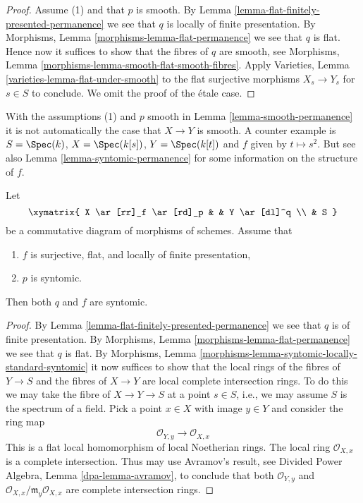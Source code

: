 \begin{proof}
Assume (1) and that $p$ is smooth. By
Lemma \ref{lemma-flat-finitely-presented-permanence}
we see that $q$ is locally of finite presentation.
By
Morphisms, Lemma \ref{morphisms-lemma-flat-permanence}
we see that $q$ is flat.
Hence now it suffices to show that the fibres of $q$ are smooth, see
Morphisms, Lemma \ref{morphisms-lemma-smooth-flat-smooth-fibres}.
Apply
Varieties, Lemma \ref{varieties-lemma-flat-under-smooth}
to the flat surjective morphisms $X_s \to Y_s$ for $s \in S$ to
conclude. We omit the proof of the \'etale case.
\end{proof}

\begin{remark}
\label{remark-smooth-permanence}
With the assumptions (1) and $p$ smooth in
Lemma \ref{lemma-smooth-permanence}
it is not automatically the case that $X \to Y$ is smooth.
A counter example is $S = \Spec(k)$, $X = \Spec(k[s])$,
$Y = \Spec(k[t])$ and $f$ given by $t \mapsto s^2$.
But see also Lemma \ref{lemma-syntomic-permanence}
for some information on the structure of $f$.
\end{remark}

\begin{lemma}
\label{lemma-syntomic-permanence}
Let
$$
\xymatrix{
X \ar[rr]_f \ar[rd]_p & &
Y \ar[dl]^q \\
& S
}
$$
be a commutative diagram of morphisms of schemes. Assume that
\begin{enumerate}
\item $f$ is surjective, flat, and locally of finite presentation,
\item $p$ is syntomic.
\end{enumerate}
Then both $q$ and $f$ are syntomic.
\end{lemma}

\begin{proof}
By Lemma \ref{lemma-flat-finitely-presented-permanence} we see that $q$
is of finite presentation. By
Morphisms, Lemma \ref{morphisms-lemma-flat-permanence}
we see that $q$ is flat.
By Morphisms, Lemma \ref{morphisms-lemma-syntomic-locally-standard-syntomic}
it now suffices to show that the local rings of the fibres of
$Y \to S$ and the fibres of $X \to Y$ are local complete intersection
rings. To do this we may take the fibre of $X \to Y \to S$ at
a point $s \in S$, i.e., we may assume $S$ is the spectrum of a
field. Pick a point $x \in X$ with image $y \in Y$ and
consider the ring map
$$
\mathcal{O}_{Y, y} \longrightarrow \mathcal{O}_{X, x}
$$
This is a flat local homomorphism of local Noetherian rings.
The local ring $\mathcal{O}_{X, x}$ is a complete intersection.
Thus may use Avramov's result, see
Divided Power Algebra, Lemma \ref{dpa-lemma-avramov},
to conclude that both $\mathcal{O}_{Y, y}$ and
$\mathcal{O}_{X, x}/\mathfrak m_y\mathcal{O}_{X, x}$ are
complete intersection rings.
\end{proof}

